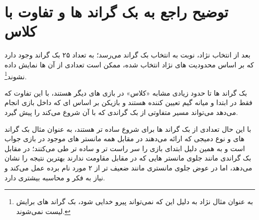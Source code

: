 \chapter{توضیح راجع به بک گراند ها و تفاوت با کلاس}

بعد از انتخاب نژاد، نوبت به انتخاب بک گراند می‌رسد؛
به تعداد ۲۵ بک گراند وجود دارد که بر اساس محدودیت های نژاد انتخاب شده، ممکن است تعدادی از آن ها نمایش داده نشوند\footnote{به عنوان مثال نژاد  به دلیل این که نمی‌تواند پیرو خدایی شود، بک گراند های  برایش لیست نمی‌شوند.}.

بک گراند ها تا حدود زیادی مشابه «کلاس» در بازی های دیگر هستند، با این تفاوت که فقط در ابتدا و میانه گیم تعیین کننده هستند و بازیکن بر اساس  ای که داخل بازی انجام می‌دهد می‌تواند مسیر متفاوتی از بک گراندی که با آن شروع می‌کند را پیش گیرد.

با این حال تعدادی از بک گراند ها برای شروع ساده تر هستند، به عنوان مثال بک گراند های  و  نوع دمیجی که ارائه می‌دهند در مقابل همه مانستر های موجود در بازی جواب است و به همین دلیل ابتدای بازی را سر راست تر و ساده تر طی می‌کنند؛
در مقابل بک گراندی مانند  جلوی مانستر هایی که در مقابل  مقاومت ندارند بهترین نتیجه را نشان می‌دهد، اما در عوض جلوی مانستری مانند  ضعیف تر از ۲ مورد نام برده عمل می‌کند و نیاز به فکر و محاسبه بیشتری دارد.
